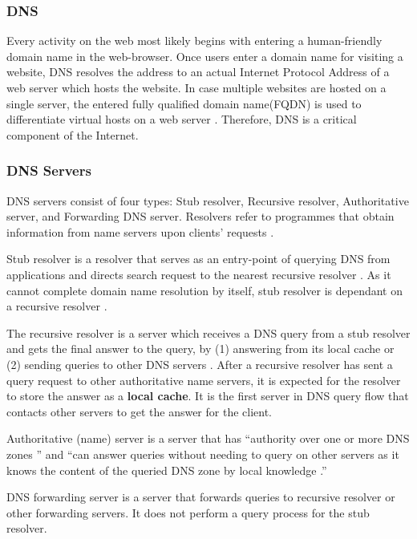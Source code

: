 \subsubsection{DNS}\label{dns-introduction}
Every activity on the web most likely begins with entering a human-friendly domain name in the web-browser. Once users enter a domain name for visiting a website, DNS resolves the address to an actual Internet Protocol Address of a web server which hosts the website. In case multiple websites are hosted on a single server, the entered fully qualified domain name(FQDN) is used to differentiate virtual hosts on a web server \cite{virtual24host}. Therefore, DNS is a critical component of the Internet.
\subsubsection{DNS Servers}\label{dnsservers}
DNS servers consist of four types: Stub resolver, Recursive resolver, Authoritative server, and Forwarding DNS server. Resolvers refer to programmes that obtain information from name servers upon clients' requests \cite{rfc1034}.

Stub resolver is a resolver that serves as an entry-point of querying DNS from applications and directs search request to the nearest recursive resolver \cite{rfc1123}. As it cannot complete domain name resolution by itself, stub resolver is dependant on a recursive resolver \cite{rfc8499}.

The recursive resolver is a server which receives a DNS query from a stub resolver and gets the final answer to the query, by (1) answering from its local cache or (2) sending queries to other DNS servers \cite{rfc8499}. After a recursive resolver has sent a query request to other authoritative name servers, it is expected for the resolver to store the answer as a \textbf{local cache}. It is the first server in DNS query flow that contacts other servers to get the answer for the client. 

Authoritative (name) server is a server that has ``authority over one or more DNS zones \cite{rfc8499}'' and ``can answer queries without needing to query on other servers as it knows the content of the queried DNS zone by local knowledge \cite{rfc2182}.''

DNS forwarding server is a server that forwards queries to recursive resolver or other forwarding servers. It does not perform a query process for the stub resolver.
